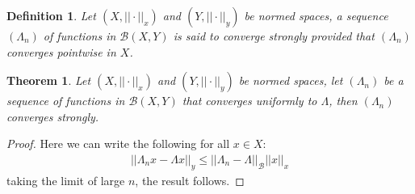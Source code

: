 \documentclass[11pt]{book}
\theoremstyle{break}
\theoremstyle{break}
\newtheorem{thm}{Theorem}[section]
\newtheorem{defn}{Definition}[corL]
\begin{document}
\begin{defn}
Let $(X,||\cdot ||_x)$ and $(Y, ||\cdot ||_y)$ be normed spaces, a sequence $(\Lambda_n)$ of functions in $\mathcal{B}(X,Y)$ is said to converge strongly provided that $(\Lambda_n)$ converges pointwise in $X$. 
\end{defn}

\begin{thm}
Let $(X,||\cdot ||_x)$ and $(Y, ||\cdot ||_y)$ be normed spaces, let $(\Lambda_n)$ be a sequence of functions in $\mathcal{B}(X,Y)$ that converges uniformly to $\Lambda$, then $(\Lambda_n)$ converges strongly. 
\end{thm}
\begin{proof}
Here we can write the following for all $x \in X$:
\begin{align*}
||\Lambda_n x - \Lambda x ||_y \leq ||\Lambda_n - \Lambda ||_{\mathcal{B}}||x||_x
\end{align*}
taking the limit of large $n$, the result follows. 
\end{proof}
\end{document}

